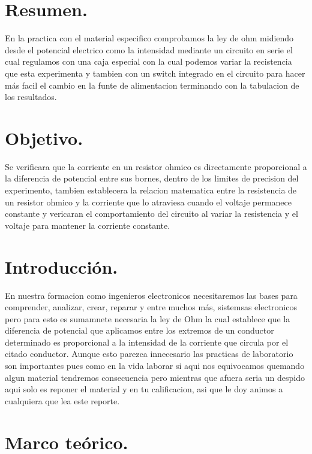 \documentclass[10pt]{article}
\begin{document}
\tableofcontents
\newpage

\section{Resumen.}
En la practica con el material especifico comprobamos la ley de ohm midiendo desde el potencial electrico como la intensidad mediante un circuito en serie el cual regulamos con una caja especial con la cual podemos variar la recistencia que esta experimenta y tambien con un switch integrado en el circuito para hacer más facil el cambio en la funte de alimentacion terminando con la tabulacion de los resultados. 

\begin{multicols}{2}

\section{Objetivo.}
Se verificara que la corriente en un resistor ohmico es directamente proporcional a la diferencia de potencial entre sus bornes, dentro de los limites de precision del experimento, tambien establecera la relacion matematica entre la resistencia de un resistor ohmico y la corriente que lo atraviesa cuando el voltaje permanece constante y vericaran el comportamiento del circuito al variar la resistencia y el voltaje para mantener la corriente constante.


\section{Introducción.}
En nuestra formacion como ingenieros electronicos necesitaremos las bases para comprender, analizar, crear, reparar y entre muchos más, sistemsas electronicos pero para esto es sumamnete necesaria la ley de Ohm la cual establece que la diferencia de potencial que aplicamos entre los extremos de un conductor determinado es proporcional a la intensidad de la corriente que circula por el citado conductor.
Aunque esto parezca innecesario las practicas de laboratorio son importantes pues como en la vida laborar si aqui nos equivocamos quemando algun material tendremos consecuencia pero mientras que afuera seria un despido aqui solo es reponer el material y en tu calificacion, asi que le doy animos a cualquiera que lea este reporte.


\section{Marco teórico.}


\end{multicols}
\end{document}
